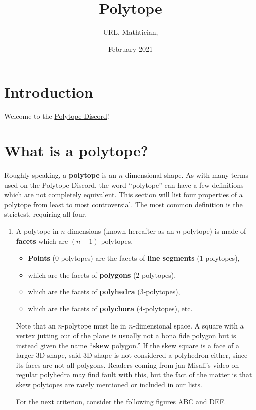 \documentclass{article}
\title{Polytope}
\author{URL, Mathtician, }
\date{February 2021}
\begin{document}
\maketitle

\section{Introduction}
Welcome to the \href{https://discord.gg/invite/zMRu7T4}{Polytope Discord}!

\section{What is a polytope?}
Roughly speaking, a \textbf{polytope} is an $n$-dimensional shape.
As with many terms used on the Polytope Discord,
the word ``polytope'' can have a few definitions which are not completely equivalent.
This section will list four properties of a polytope from least to most controversial.
The most common definition is the strictest, requiring all four.
\begin{enumerate}
  \item
A polytope in $n$ dimensions (known hereafter as an $n$-polytope)
is made of \textbf{facets} which are $(n-1)$-polytopes.
\begin{itemize}
\item \textbf{Points} ($0$-polytopes) are the facets of \textbf{line segments} ($1$-polytopes),
\item which are the facets of \textbf{polygons} ($2$-polytopes),
\item which are the facets of \textbf{polyhedra} ($3$-polytopes),
\item which are the facets of \textbf{polychora} ($4$-polytopes), etc.
\end{itemize}

Note that an $n$-polytope must lie in $n$-dimensional space.
A square with a vertex jutting out of the plane is usually not a bona fide polygon
but is instead given the name ``\textbf{skew} polygon.''
If the skew square is a face of a larger 3D shape,
said 3D shape is not considered a polyhedron either,
since its faces are not all polygons.
Readers coming from jan Misali's video on regular polyhedra may find fault with this,
but the fact of the matter is that
skew polytopes are rarely mentioned or included in our lists.

For the next criterion, consider the following figures ABC and DEF.
\end{enumerate}
\end{document}
